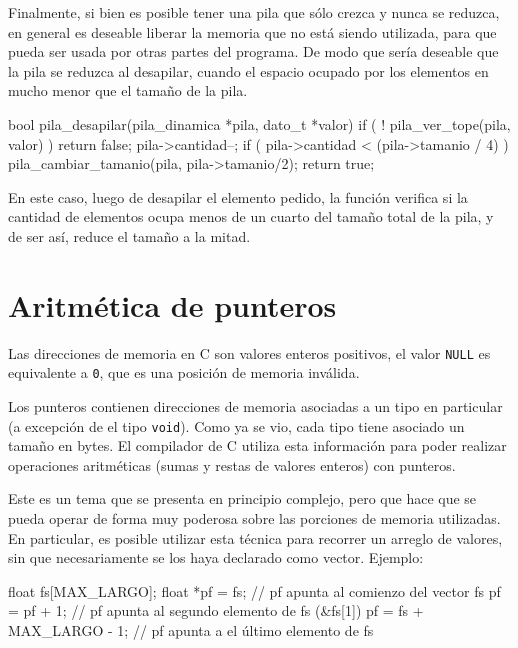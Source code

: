 Finalmente, si bien es posible tener una pila que sólo crezca y nunca se
reduzca, en general es deseable liberar la memoria que no está siendo
utilizada, para que pueda ser usada por otras partes del programa.  De modo
que sería deseable que la pila se reduzca al desapilar, cuando el espacio
ocupado por los elementos en mucho menor que el tamaño de la pila.

\begin{codigo-c-plano}
bool pila_desapilar(pila_dinamica *pila, dato_t *valor)
{
    if ( ! pila_ver_tope(pila, valor) ) return false;
    pila->cantidad--;
    if ( pila->cantidad < (pila->tamanio / 4) ) {
        pila_cambiar_tamanio(pila, pila->tamanio/2);
    }
    return true;
}
\end{codigo-c-plano}

En este caso, luego de desapilar el elemento pedido, la función verifica si la
cantidad de elementos ocupa menos de un cuarto del tamaño total de la pila, y
de ser así, reduce el tamaño a la mitad.

\section{Aritmética de punteros}

Las direcciones de memoria en C son valores enteros positivos, el valor
\lstinline!NULL! es equivalente a \lstinline!0!, que es una posición de memoria
inválida. 

Los punteros contienen direcciones de memoria asociadas a un tipo en
particular (a excepción de el tipo \lstinline!void!). Como ya se vio, cada
tipo tiene asociado un tamaño en bytes. El compilador de C utiliza esta
información para poder realizar operaciones aritméticas (sumas y restas de
valores enteros) con punteros.

Este es un tema que se presenta en principio complejo, pero que hace que se
pueda operar de forma muy poderosa sobre las porciones de memoria utilizadas.
En particular, es posible utilizar esta técnica para recorrer un arreglo de
valores, sin que necesariamente se los haya declarado como vector. Ejemplo:

\begin{codigo-c-plano}
float fs[MAX_LARGO];       
float *pf = fs;           // pf apunta al comienzo del vector fs
pf = pf + 1;              // pf apunta al segundo elemento de fs (&fs[1])
pf = fs + MAX_LARGO - 1;  // pf apunta a el último elemento de fs
\end{codigo-c-plano}

